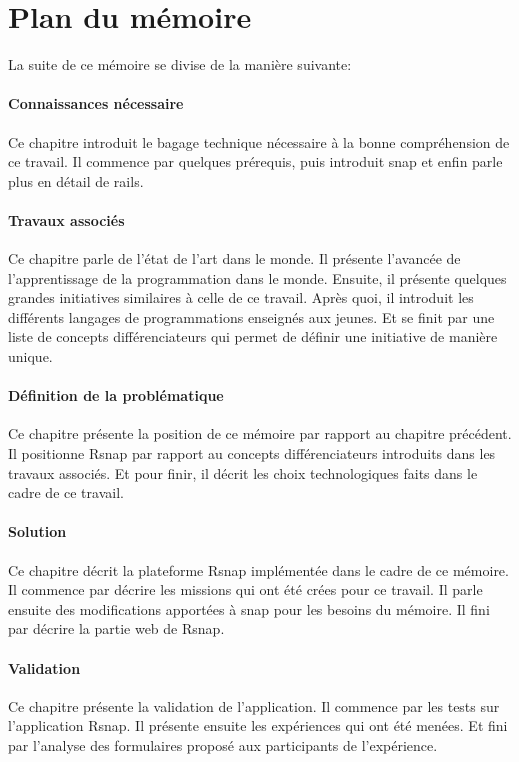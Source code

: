 \section{Plan du mémoire}
La suite de ce mémoire se divise de la manière suivante:

\paragraph{Connaissances nécessaire}
Ce chapitre introduit le bagage technique nécessaire à la bonne compréhension de ce travail. Il commence par quelques prérequis, puis introduit \gls{snap} et enfin parle plus en détail de \gls{rails}.

\paragraph{Travaux associés}
Ce chapitre parle de l'état de l'art dans le monde. Il présente l'avancée de l'apprentissage de la programmation dans le monde. Ensuite, il présente quelques grandes initiatives similaires à celle de ce travail. Après quoi, il introduit les différents langages de programmations enseignés aux jeunes. Et se finit par une liste de concepts différenciateurs qui permet de définir une initiative de manière unique.

\paragraph{Définition de la problématique}
Ce chapitre présente la position de ce mémoire par rapport au chapitre précédent. Il positionne \gls{Rsnap} par rapport au concepts différenciateurs introduits dans les travaux associés. Et pour finir, il décrit les choix technologiques faits dans le cadre de ce travail.

\paragraph{Solution}
Ce chapitre décrit la plateforme \gls{Rsnap} implémentée dans le cadre de ce mémoire.
Il commence par décrire les missions qui ont été crées pour ce travail. Il parle ensuite des modifications apportées à \gls{snap} pour les besoins du mémoire. Il fini par décrire la partie web de \gls{Rsnap}.

\paragraph{Validation}
Ce chapitre présente la validation de l'application. Il commence par les tests sur l'application \gls{Rsnap}. Il présente ensuite les expériences qui ont été menées. Et fini par l'analyse des formulaires proposé aux participants de l'expérience.

